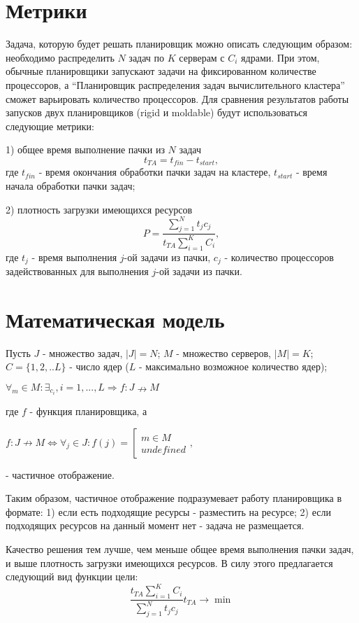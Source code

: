 \documentclass{article}
\begin{document}
\section{Метрики}
Задача, которую будет решать планировщик можно описать следующим образом: необходимо распределить $N$ задач по $K$ серверам с $C_i$ ядрами. При этом, обычные планировщики запускают задачи на фиксированном количестве процессоров, а “Планировщик распределения задач вычислительного кластера” сможет варьировать количество процессоров. 
Для сравнения результатов работы запусков двух планировщиков (rigid и moldable) будут использоваться следующие метрики: 

1) общее время выполнение пачки из $N$ задач $$t_{TA}=t_{fin}-t_{start},$$ где $t_{fin}$ - время окончания обработки пачки задач на кластере, $t_{start}$ - время начала обработки пачки задач; 

2) плотность загрузки имеющихся ресурсов $$P =\frac{
\sum_{j=1}^{N} 
t_j c_j}
{t_{TA} 
\sum_{i=1}^{K} 
C_i
},$$ где $t_j$ - время выполнения $j$-ой задачи из пачки,  $c_j$ - количество процессоров задействованных для выполнения $j$-ой задачи из пачки. 

\section{Математическая модель}

Пусть $J$ - множество задач, $|J|=N$;
$M$ - множество серверов, $|M|=K$;
$C = \{1,2,..L\}$ - число ядер ($L$ - максимально возможное количество ядер);
\begin{center}
\begin{math}
\forall_m \in M:\exists_{c_i}, i=1,...,L \Rightarrow f:J \nrightarrow M
\end{math}
\end{center}
где $f$ - функция планировщика, а
\begin{center}
\begin{math}
f:J \nrightarrow M \Leftrightarrow
\forall_j \in J : f(j) = \left[ \begin{matrix} m \in M \\ undefined   \end{matrix} \right.,
\end{math}
\end{center}
- частичное отображение.

Таким образом, частичное отображение подразумевает работу планировщика в формате: 1) если есть подходящие ресурсы - разместить на ресурсе; 2) если подходящих ресурсов на данный момент нет - задача не размещается. 

Качество решения тем лучше, чем меньше общее время выполнения пачки задач, и выше плотность загрузки имеющихся ресурсов. В силу этого предлагается следующий вид функции цели:
$$
\frac
{t_{TA} 
\sum_{i=1}^{K} 
C_i
}
{
\sum_{j=1}^{N} 
t_j c_j}
t_{TA} \rightarrow \min
$$
\end{document}
